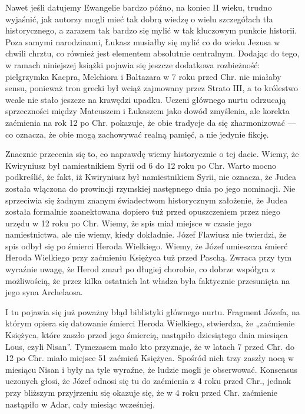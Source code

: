 Nawet jeśli datujemy Ewangelie bardzo późno, na koniec II wieku, trudno wyjaśnić, jak autorzy mogli mieć tak dobrą wiedzę o wielu szczegółach tła historycznego, a zarazem tak bardzo się mylić w tak kluczowym punkcie historii.
Poza samymi narodzinami, Łukasz musiałby się mylić co do wieku Jezusa w chwili chrztu, co również jest elementem absolutnie centralnym.
Dodając do tego, w ramach niniejszej książki pojawia się jeszcze dodatkowa rozbieżność: pielgrzymka Kacpra, Melchiora i Baltazara w 7 roku przed Chr. nie miałaby sensu, ponieważ tron grecki był wciąż zajmowany przez Strato III, a to królestwo wcale nie stało jeszcze na krawędzi upadku.
Uczeni głównego nurtu odrzucają sprzeczności między Mateuszem i Łukaszem jako dowód zmyślenia, ale korekta zaćmienia na rok 12 po Chr. pokazuje, że obie tradycje da się zharmonizować --- co oznacza, że obie mogą zachowywać realną pamięć, a nie jedynie fikcję.

Znacznie przecenia się to, co naprawdę wiemy historycznie o tej dacie.
Wiemy, że Kwiryniusz był namiestnikiem Syrii od 6 do 12 roku po Chr.
Warto mocno podkreślić, że fakt, iż Kwiryniusz był namiestnikiem Syrii, nie oznacza, że Judea została włączona do prowincji rzymskiej następnego dnia po jego nominacji.
Nie sprzeciwia się żadnym znanym świadectwom historycznym założenie, że Judea została formalnie zaanektowana dopiero tuż przed opuszczeniem przez niego urzędu w 12 roku po Chr.
Wiemy, że spis miał miejsce w czasie jego namiestnictwa, ale nie wiemy, kiedy dokładnie.
Józef Flawiusz nie twierdzi, że spis odbył się po śmierci Heroda Wielkiego.
Wiemy, że Józef umieszcza śmierć Heroda Wielkiego przy zaćmieniu Księżyca tuż przed Paschą.
Zwraca przy tym wyraźnie uwagę, że Herod zmarł po długiej chorobie, co dobrze współgra z możliwością, że przez kilka ostatnich lat władza była faktycznie przesunięta na jego syna Archelaosa.

I tu pojawia się już poważny błąd biblistyki głównego nurtu.
Fragment Józefa, na którym opiera się datowanie śmierci Heroda Wielkiego, stwierdza, że „zaćmienie Księżyca, które zaszło przed jego śmiercią, nastąpiło dziesiątego dnia miesiąca Lous, czyli Nisan”.
Tymczasem mało kto przyznaje, że w latach 7 przed Chr. do 12 po Chr. miało miejsce 51 zaćmień Księżyca.
Spośród nich trzy zaszły nocą w miesiącu Nisan i były na tyle wyraźne, że ludzie mogli je obserwować.
Konsensus uczonych głosi, że Józef odnosi się tu do zaćmienia z 4 roku przed Chr., jednak przy bliższym przyjrzeniu się okazuje się, że w 4 roku przed Chr. zaćmienie nastąpiło w Adar, cały miesiąc wcześniej.

